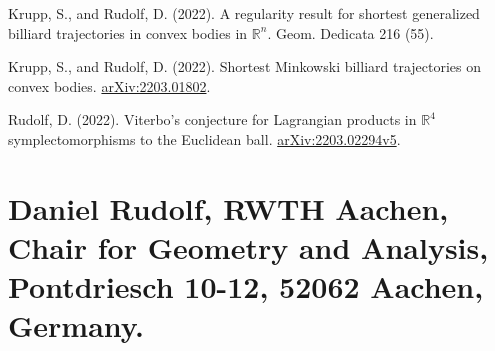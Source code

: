 \documentclass[12pt]{amsart}
\theoremstyle{plain}
\theoremstyle{remark}
\theoremstyle{definition}
\newcommand{\R}{\mathbb{R}}
\begin{document}
\begin{thebibliography}{}
Krupp, S., and Rudolf, D. (2022). A regularity result for shortest generalized billiard trajectories in convex bodies in $\R^n$. Geom. Dedicata 216 (55).

Krupp, S., and Rudolf, D. (2022). Shortest Minkowski billiard trajectories on convex bodies. \href{https://arxiv.org/pdf/2203.01802.pdf}{arXiv:2203.01802}.

Rudolf, D. (2022). Viterbo's conjecture for Lagrangian products  in $\R^4$ symplectomorphisms to the Euclidean ball. \href{https://arxiv.org/abs/2203.02294v5}{arXiv:2203.02294v5}.

\end{thebibliography}

\medskip


\section*{Daniel Rudolf, RWTH Aachen, Chair for Geometry and Analysis, Pontdriesch 10-12, 52062 Aachen, Germany.}
\end{document}

